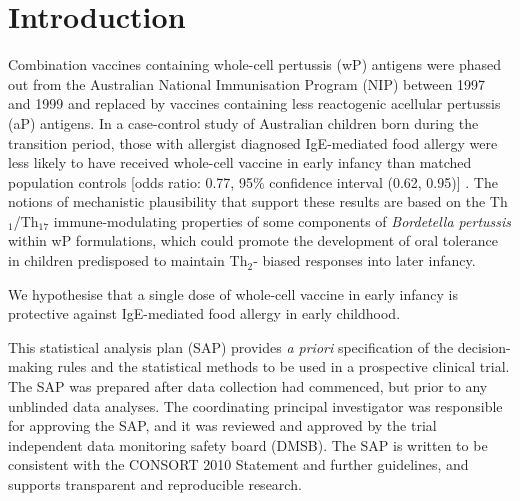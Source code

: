 \documentclass{bmcart}
\begin{document}


\section*{Introduction}

Combination vaccines containing whole-cell pertussis (wP) antigens were phased out from the Australian National Immunisation Program (NIP) between 1997 and 1999 and replaced by vaccines containing less reactogenic acellular pertussis (aP) antigens.
In a case-control study of Australian children born during the transition period, those with allergist diagnosed IgE-mediated food allergy were less likely to have received whole-cell vaccine in early infancy than matched population controls [odds ratio: 0.77, 95\% confidence interval (0.62, 0.95)] \cite{estcourt2020whole}.
The notions of mechanistic plausibility that support these results are based on the Th$_1$/Th$_{17}$ immune-modulating properties of some components of \textit{Bordetella pertussis} within wP formulations, which could promote the development of oral tolerance in children predisposed to maintain Th$_2$- biased responses into later infancy.\cite{perez2020}

We hypothesise that a single dose of whole-cell vaccine in early infancy is protective against IgE-mediated food allergy in early childhood.

This statistical analysis plan (SAP) provides \textit{a priori} specification of the decision-making rules and the statistical methods to be used in a prospective clinical trial. 
The SAP was prepared after data collection had commenced, but prior to any unblinded data analyses. 
The coordinating principal investigator was responsible for approving the SAP, and it was reviewed and approved by the trial independent data monitoring safety board (DMSB). 
The SAP is written to be consistent with the CONSORT 2010 Statement and further guidelines, and supports transparent and reproducible research.
\end{document}
